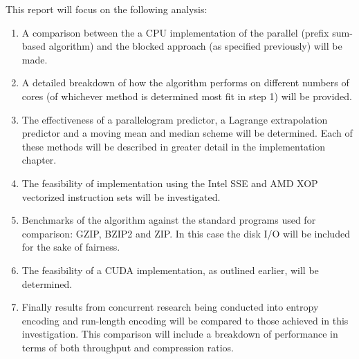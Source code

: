 This report will focus on the following analysis:
\begin{enumerate}
 \item A comparison between the a CPU implementation of the parallel (prefix sum-based algorithm) and the blocked approach (as specified previously) will be made.
 \item A detailed breakdown of how the algorithm performs on different numbers of cores (of whichever method is determined most fit in step 1) will be provided.
 \item The effectiveness of a parallelogram predictor, a Lagrange extrapolation predictor \cite{engelson2000lossless} and a moving mean and median scheme will be determined. 
       Each of these methods will be described in greater detail in the implementation chapter.
 \item The feasibility of implementation using the Intel SSE and AMD XOP vectorized instruction sets will be investigated.
 \item Benchmarks of the algorithm against the standard programs used for comparison: GZIP, BZIP2 and ZIP. In this case the disk I/O will be included for the sake of fairness.
 \item The feasibility of a CUDA implementation, as outlined earlier, will be determined.
 \item Finally results from concurrent research being conducted into entropy encoding and run-length encoding will be compared to those achieved in this investigation. This comparison will include a 
       breakdown of performance in terms of both throughput and compression ratios.
\end{enumerate}
